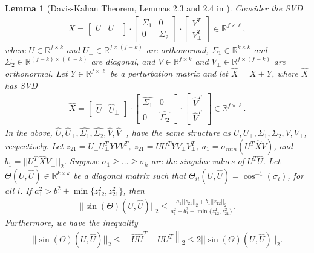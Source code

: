 \documentclass{article}
\newtheorem{lemma}{Lemma}
\begin{document}
\begin{lemma}[Davis-Kahan Theorem, Lemmas 2.3 and 2.4 in \cite{SinSte21}]
\label{lemma:l2.3SinSte}
Consider the SVD 
\begin{align*}
X = \begin{bmatrix}
U & U_{\perp}
\end{bmatrix}\cdot \begin{bmatrix}
\Sigma_1 & 0\\
0 & \Sigma_2
\end{bmatrix}\cdot \begin{bmatrix}
V^T\\
V_{\perp}^T
\end{bmatrix} \in \mathbb{R}^{f \times \ell},
\end{align*}
where $U \in \mathbb{R}^{f \times k}$ and $U_{\perp} \in \mathbb{R}^{f \times (f - k)}$ are orthonormal, $\Sigma_1 \in \mathbb{R}^{k \times k}$ and $\Sigma_2 \in \mathbb{R}^{(f - k) \times (\ell - k)}$ are diagonal, and $V \in \mathbb{R}^{f \times k}$ and $V_{\perp} \in \mathbb{R}^{f \times (f - k)}$ are orthonormal. Let $Y \in \mathbb{R}^{f \times \ell}$ be a perturbation matrix and let $\hat{X} = X + Y$, where $\hat{X}$ has SVD
\begin{align*}
\hat{X} = \begin{bmatrix}
\hat{U} & \hat{U}_{\perp}
\end{bmatrix}\cdot \begin{bmatrix}
\hat{\Sigma_1} & 0\\
0 & \hat{\Sigma_2}
\end{bmatrix}\cdot \begin{bmatrix}
\hat{V}^T\\
\hat{V}_{\perp}^T
\end{bmatrix} \in \mathbb{R}^{f \times \ell}.
\end{align*}
In the above, $\hat{U}, \hat{U}_{\perp}, \hat{\Sigma_1}, \hat{\Sigma_2}, \hat{V}, \hat{V}_{\perp}$, have the same structure as $U, U_{\perp}, \Sigma_1, \Sigma_2, V, V_{\perp}$, respectively. Let $z_{21} = U_{\perp}U_{\perp}^TYVV^T$, $z_{21} = UU^TYV_{\perp}V_{\perp}^T$, $a_1 = \sigma_{min}(U^T\hat{X}V)$, and $b_1 = ||U_{\perp}^T\hat{X}V_{\perp}||_2$. Suppose $\sigma_1 \geq \dots \geq \sigma_k$ are the singular values of $U^T\hat{U}$. Let $\Theta(U, \hat{U}) \in \mathbb{R}^{k \times k}$ be a diagonal matrix such that $\Theta_{ii}(U, \hat{U}) = \cos^{-1}(\sigma_i)$, for all $i$. If $a_1^2 > b_1^2 + \min\{z_{12}^2, z_{21}^2\}$, then
\begin{align*}
||\sin(\Theta)(U, \hat{U})||_2 \leq \frac{a_1||z_{21}||_2 + b_1||z_{12}||_2}{a_1^2 - b_1^2 - \min\{z_{12}^2, z_{21}^2\}}.
\end{align*}
Furthermore, we have the inequality
\begin{align*}
||\sin(\Theta)(U, \hat{U})||_2 \leq \left\|\hat{U}\hat{U}^T - UU^T\right\|_2 \leq 2||\sin(\Theta)(U, \hat{U})||_2.
\end{align*}
\end{lemma}
\end{document}
